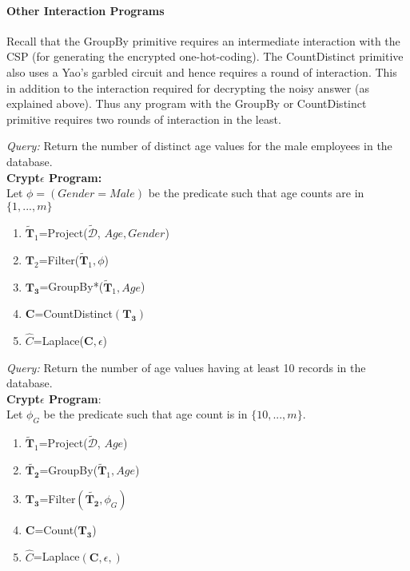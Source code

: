 \paragraph{\textbf{Other Interaction Programs}}
Recall that the \textsf{GroupBy} primitive requires an intermediate interaction with the \textsf{CSP} (for generating the encrypted one-hot-coding). The \textsf{CountDistinct} primitive also uses a Yao's garbled circuit and hence requires a round of interaction. This in addition to the interaction required for decrypting the noisy answer (as explained above). Thus any program with the \textsf{GroupBy} or \textsf{CountDistinct} primitive requires two rounds of interaction in the least. 
\begin{exmp}\textit{Query:} Return the number of distinct age values for the male employees in the database. \\ \textbf{Crypt$\epsilon$ Program:} \\Let  $\phi=(Gender=Male)$ be the predicate such that age counts are in $\{1,...,m\}$\end{exmp} \begin{enumerate}\item $\mathbf{\tilde{T}}_1$=\textsf{Project}($\boldsymbol{\tilde{\mathcal{D}}}$, $Age,Gender$) \item $\mathbf{T}_2$=\textsf{Filter}($\mathbf{\tilde{T}}_1,\phi$) \item $\mathbf{T_3}$=\textsf{GroupBy*}($\mathbf{\tilde{T}}_1,Age$)\item $\mathbf{C}$=\textsf{CountDistinct}$(\mathbf{T_3})$\item $\hat{C}$=\textsf{Laplace}($\mathbf{C},\epsilon$)\end{enumerate} \begin{exmp}\textit{Query: } Return the number of  age values having at least 10 records in the database. \\ \textbf{Crypt$\epsilon$ Program}:\\ Let $\phi_G$ be the predicate such that age count is in $\{10,...,m\}$. \end{exmp}\begin{enumerate}\item $\mathbf{\tilde{T}}_1$=\textsf{Project}($\boldsymbol{\tilde{\mathcal{D}}}$, $Age$) \item $\mathbf{\tilde{T_2}}$=\textsf{GroupBy}($\mathbf{\tilde{T}}_1,Age$)\item $\mathbf{T_3}$=\textsf{Filter}$(\mathbf{\tilde{T_2}},\phi_G)$\item $\mathbf{C}$=\textsf{Count}($\mathbf{T_3}$)\item $\hat{C}$=\textsf{Laplace}$(\mathbf{C},\epsilon,)$\end{enumerate}